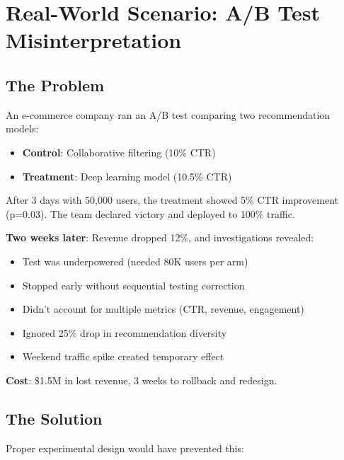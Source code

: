 \section{Real-World Scenario: A/B Test Misinterpretation}

\subsection{The Problem}

An e-commerce company ran an A/B test comparing two recommendation models:
\begin{itemize}
    \item \textbf{Control}: Collaborative filtering (10\% CTR)
    \item \textbf{Treatment}: Deep learning model (10.5\% CTR)
\end{itemize}

After 3 days with 50,000 users, the treatment showed 5\% CTR improvement (p=0.03). The team declared victory and deployed to 100\% traffic.

\textbf{Two weeks later}: Revenue dropped 12\%, and investigations revealed:
\begin{itemize}
    \item Test was underpowered (needed 80K users per arm)
    \item Stopped early without sequential testing correction
    \item Didn't account for multiple metrics (CTR, revenue, engagement)
    \item Ignored 25\% drop in recommendation diversity
    \item Weekend traffic spike created temporary effect
\end{itemize}

\textbf{Cost}: \$1.5M in lost revenue, 3 weeks to rollback and redesign.

\subsection{The Solution}

Proper experimental design would have prevented this:

